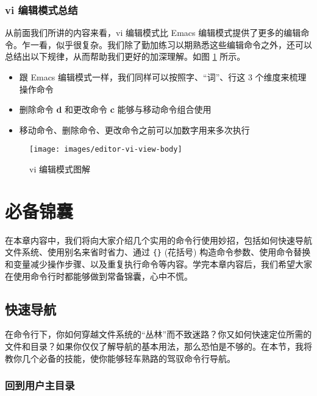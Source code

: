 \documentclass[]{ctexbook}
\providecommand{\tightlist}{%
  \setlength{\itemsep}{0pt}\setlength{\parskip}{0pt}}
\begin{document}
\hypertarget{vi-ux7f16ux8f91ux6a21ux5f0fux603bux7ed3}{%
\subsection{vi 编辑模式总结}\label{vi-ux7f16ux8f91ux6a21ux5f0fux603bux7ed3}}

从前面我们所讲的内容来看，vi 编辑模式比 Emacs 编辑模式提供了更多的编辑命令。乍一看，似乎很复杂。我们除了勤加练习以期熟悉这些编辑命令之外，还可以总结出以下规律，从而帮助我们更好的加深理解。如图 \ref{fig:vi-mode-i} 所示。

\begin{itemize}
\tightlist
\item
  跟 Emacs 编辑模式一样，我们同样可以按照字、``词''、行这 3 个维度来梳理操作命令
\item
  删除命令 \textbf{d} 和更改命令 \textbf{c} 能够与移动命令组合使用
\item
  移动命令、删除命令、更改命令之前可以加数字用来多次执行
\end{itemize}

\begin{figure}
\texttt{[image: images/editor-vi-view-body]} \caption{vi 编辑模式图解}\label{fig:vi-mode-i}
\end{figure}

\hypertarget{ux5fc5ux5907ux9526ux56ca}{%
\chapter{必备锦囊}\label{ux5fc5ux5907ux9526ux56ca}}

在本章内容中，我们将向大家介绍几个实用的命令行使用妙招，包括如何快速导航文件系统、使用别名来省时省力、通过 \texttt{\{\}} (花括号) 构造命令参数、使用命令替换和变量减少操作步骤、以及重复执行命令等内容。学完本章内容后，我们希望大家在使用命令行时都能够做到常备锦囊，心中不慌。

\hypertarget{ux5febux901fux5bfcux822a}{%
\section{快速导航}\label{ux5febux901fux5bfcux822a}}

在命令行下，你如何穿越文件系统的``丛林''而不致迷路？你又如何快速定位所需的文件和目录？如果你仅仅了解导航的基本用法，那么恐怕是不够的。在本节，我将教你几个必备的技能，使你能够轻车熟路的驾驭命令行导航。

\hypertarget{ux56deux5230ux7528ux6237ux4e3bux76eeux5f55}{%
\subsection{回到用户主目录}\label{ux56deux5230ux7528ux6237ux4e3bux76eeux5f55}}
\end{document}
